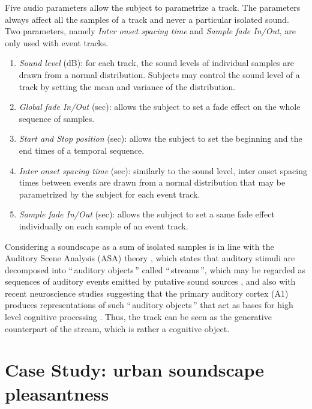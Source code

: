 \documentclass[twoside,twocolumn]{article}
\begin{document}
Five audio parameters allow the subject to parametrize a track. The parameters always affect all the samples of a track and never a particular isolated sound. Two parameters, namely \textit{Inter onset spacing time} and \textit{Sample fade In/Out}, are only used with event tracks. 

\begin{enumerate}
\item \textit{Sound level} (dB): for each track, the sound levels of individual samples are drawn from a normal distribution. Subjects may control the sound level of a track by setting the mean and variance of the distribution. 
\item \textit{Global fade In/Out} (sec):  allows the subject to set a fade effect on the whole sequence of samples. 
\item \textit{Start and Stop position} (sec): allows the subject to set the beginning and the end times of a temporal sequence.
\item \textit{Inter onset spacing time} (sec): similarly to the sound level, inter onset spacing times between events are drawn from a normal distribution that may be parametrized by the subject for each event track.
\item \textit{Sample fade In/Out} (sec): allows the subject to set a same fade effect individually on each sample of an event track.
\end{enumerate}

Considering a soundscape as a sum of isolated samples is in line with the Auditory Scene Analysis (ASA) theory \cite{bregman1994auditory}, which states that auditory stimuli are decomposed into ``\,auditory objects\,'' called ``\,streams\,'', which may be regarded as sequences of auditory events emitted by putative sound sources \cite{ciocca2007auditory,winkler2009modeling}, and also with recent neuroscience studies suggesting that the primary auditory cortex (A1) produces representations of such ``\,auditory objects\,'' that act as bases for high level cognitive processing \cite{nelken2008neurons}. Thus, the track can be seen as the generative counterpart of the stream, which is rather a cognitive object.


\section{Case Study: urban soundscape pleasantness}
\label{sec:CaseStudyUrbanSoundscape}
\end{document}
